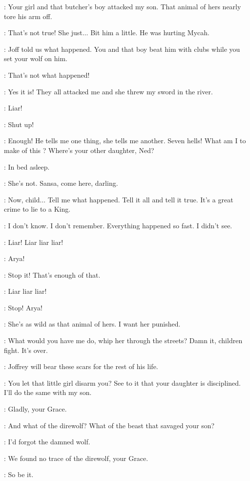 \CERSEI: Your girl and that butcher's boy attacked my son. That animal of hers nearly tore his arm off. 

\ARYA: That's not true! She just$\ldots$ Bit him a little. He was hurting Mycah. 

\CERSEI: Joff told us what happened. You and that boy beat him with clubs while you set your wolf on him. 

\ARYA: That's not what happened! 

\JOFFREY: Yes it is! They all attacked me and she threw my sword in the river. 

\ARYA: Liar! 

\JOFFREY: Shut up! 

\ROBERT: Enough! He tells me one thing, she tells me another. Seven hells! What am I to make of this ? Where's your other daughter, Ned? 

\NED: In bed asleep. 

\CERSEI: She's not. Sansa, come here, darling. 

\ROBERT: Now, child$\ldots$ Tell me what happened. Tell it all and tell it true. It's a great crime to lie to a King. 

\SANSA: I don't know. I don't remember. Everything happened so fast. I didn't see. 

\ARYA: Liar! Liar liar liar! 

\SANSA: Arya! 

\NED: Stop it! That's enough of that. 

\ARYA: Liar liar liar! 

\NED: Stop! Arya! 

\CERSEI: She's as wild as that animal of hers. I want her punished. 

\ROBERT: What would you have me do, whip her through the streets? Damn it, children fight. It's over. 

\CERSEI: Joffrey will bear these scars for the rest of his life. 

\ROBERT: You let that little girl disarm you? See to it that your daughter is disciplined. I'll do the same with my son. 

\NED: Gladly, your Grace. 

\CERSEI: And what of the direwolf? What of the beast that savaged your son? 

\ROBERT: I'd forgot the damned wolf. 

\SOLDIERa: We found no trace of the direwolf, your Grace. 

\ROBERT: So be it. 

